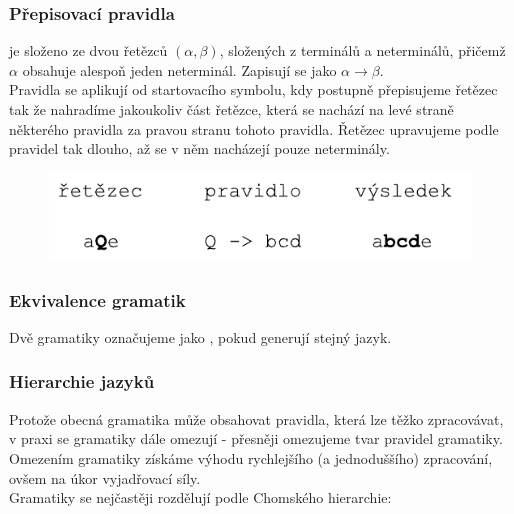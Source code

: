 \subsubsection*{Přepisovací pravidla}

 je složeno ze dvou řetězců $(\alpha, \beta)$,
složených z terminálů a neterminálů, přičemž $\alpha$ obsahuje alespoň jeden neterminál.
Zapisují se jako $\alpha \rightarrow \beta$.\\
Pravidla se aplikují od startovacího symbolu, kdy postupně přepisujeme řetězec tak že nahradíme
jakoukoliv část řetězce, která se nachází na levé straně některého pravidla za pravou stranu tohoto pravidla.
Řetězec upravujeme podle pravidel tak dlouho, až se v něm nacházejí pouze neterminály.

\begin{figure}[H]
  \centering
  \includegraphics{fig/rewriteRule.pdf}
\end{figure}

\subsubsection*{Ekvivalence gramatik}
Dvě gramatiky označujeme jako , pokud generují stejný jazyk.

\subsubsection*{Hierarchie jazyků}

Protože obecná gramatika může obsahovat pravidla, která lze těžko zpracovávat,
v praxi se gramatiky dále omezují - přesněji omezujeme tvar pravidel gramatiky.
Omezením gramatiky získáme výhodu rychlejšího (a jednoduššího) zpracování,
ovšem na úkor vyjadřovací síly.\\

\noindent
Gramatiky se nejčastěji rozdělují podle Chomského hierarchie:

